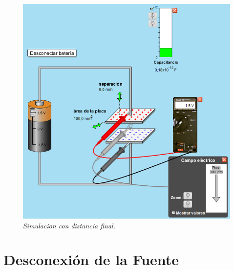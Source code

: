 \documentclass[12pt]{report}
\begin{document}
\begin{enumerate}
\begin{figure}[h]
\begin{minipage}[h]{0.4\textwidth}
        \includegraphics[width=1\textwidth]{./images/2FOTO4.png}
        \textit{Simulacion con distancia final.} 
     \end{minipage}
    \end{figure}
\end{enumerate}

\newpage 

\section{Desconexión de la Fuente}
\end{document}
